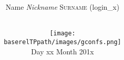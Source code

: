 \documentclass[12pt,a4paper]{report}
\begin{document}
\title{
  \vspace{1cm}
  \textbf{\Huge{\Tp{} \workshoptitle}}\\
}
\author{
  \Large{Name \textit{Nickname} \textsc{Surname} ({\ttfamily login\_x})}\\\\
}

\date{
  \vspace{1cm}
  \texttt{[image: \\baserelTPpath/images/gconfs.png]}\\
  \vspace{0.5cm}
  Day xx Month 201x
}
\maketitle
\newpage
\tableofcontents
\newpage

\end{document}
